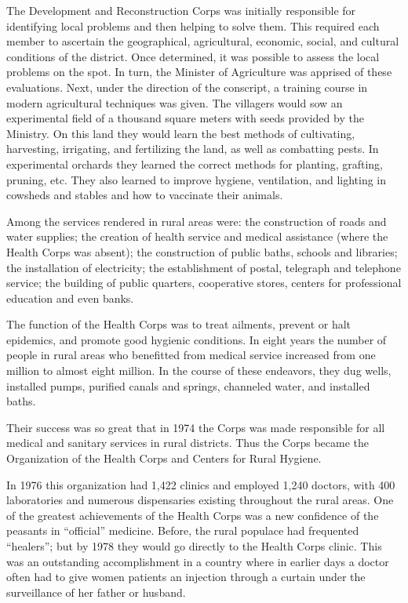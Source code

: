 The Development and Reconstruction Corps was initially responsible for identifying local problems and then helping to solve them. This required each member to ascertain the geographical, agricultural, economic, social, and cultural conditions of the district. Once determined, it was possible to assess the local problems on the spot. In turn, the Minister of Agriculture was apprised of these evaluations. Next, under the direction of the conscript, a training course in modern agricultural techniques was given. The villagers would sow an experimental field of a thousand square meters with seeds provided by the Ministry. On this land they would learn the best methods of cultivating, harvesting, irrigating, and fertilizing the land, as well as combatting pests. In experimental orchards they learned the correct methods for planting, grafting, pruning, etc. They also learned to improve hygiene, ventilation, and lighting in cowsheds and stables and how to vaccinate their animals. 

Among the services rendered in rural areas were: the construction of roads and water supplies; the creation of health service and medical assistance (where the Health Corps was absent); the construction of public baths, schools and libraries; the installation of electricity; the establishment of postal, telegraph and telephone service; the building of public quarters, cooperative stores, centers for professional education and even banks. 

The function of the Health Corps was to treat ailments, prevent or halt epidemics, and promote good hygienic conditions. In eight years the number of people in rural areas who benefitted from medical service increased from one million to almost eight million. In the course of these endeavors, they dug wells, installed pumps, purified canals and springs, channeled water, and installed baths. 

Their success was so great that in 1974 the Corps was made responsible for all medical and sanitary services in rural districts. Thus the Corps became the Organization of the Health Corps and Centers for Rural Hygiene. 

In 1976 this organization had 1,422 clinics and employed 1,240 doctors, with 400 laboratories and numerous dispensaries existing throughout the rural areas. One of the greatest achievements of the Health Corps was a new confidence of the peasants in “official” medicine. Before, the rural populace had frequented “healers”; but by 1978 they would go directly to the Health Corps clinic. This was an outstanding accomplishment in a country where in earlier days a doctor often had to give women patients an injection through a curtain under the surveillance of her father or husband. 

